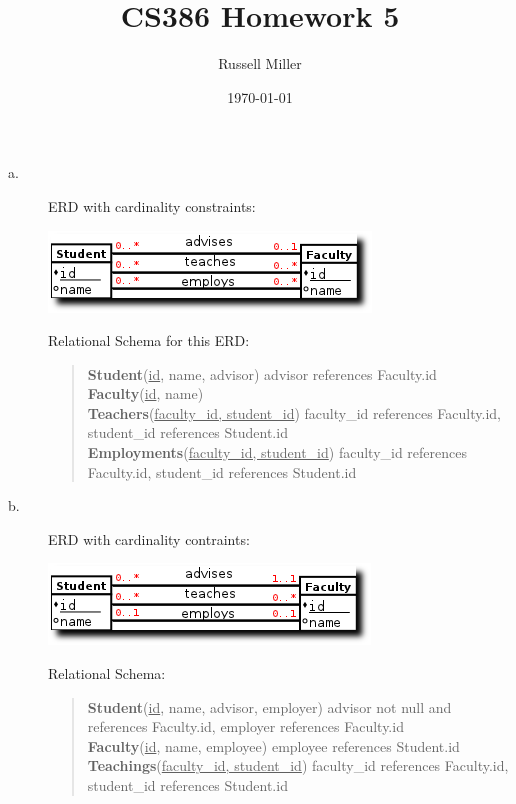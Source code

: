 \documentclass{article}
\title{CS386 Homework 5}
\author{Russell Miller}
\date{\today}
\begin{document}
\maketitle

\section{}
\begin{description}
\item[a.]
ERD with cardinality constraints:\footnotemark\\
\begin{center}
 \includegraphics[scale=.8]{1a.png}
\end{center}
Relational Schema for this ERD:
\begin{quote}
\textbf{Student}(\underline{id}, name, advisor) advisor references Faculty.id\\
\textbf{Faculty}(\underline{id}, name)\\
\textbf{Teachers}(\underline{faculty\_id, student\_id}) faculty\_id references Faculty.id, student\_id 
references Student.id\\
\textbf{Employments}(\underline{faculty\_id, student\_id}) faculty\_id references Faculty.id, student\_id 
references Student.id\\
\end{quote}

\item[b.]
ERD with cardinality contraints:\\
\begin{center}
 \includegraphics[scale=.8]{1b.png}
\end{center}
Relational Schema:
\begin{quote}
\textbf{Student}(\underline{id}, name, advisor, employer) advisor not null and references Faculty.id, employer references Faculty.id\\
\textbf{Faculty}(\underline{id}, name, employee) employee references Student.id\\
\textbf{Teachings}(\underline{faculty\_id, student\_id}) faculty\_id references Faculty.id, student\_id
references Student.id\\
\end{quote}
\end{description}
\end{document}

